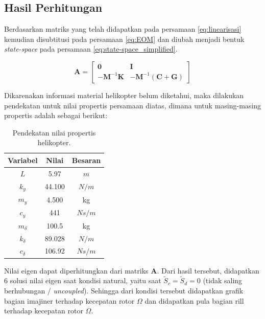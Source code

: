 \subsection{Hasil Perhitungan}

Berdasarkan matriks yang telah didapatkan pada persamaan \ref{eq:linearisasi} kemudian disubtitusi pada persamaan \ref{eq:EOM} dan diubah menjadi bentuk \textit{state-space} pada persamaan \ref{eq:state-space_simplified}.

\begin{equation}
	\mathbf{A}=\begin{bmatrix}
	\mathbf{0}& \mathbf{I}\\
	\mathbf{-M}^{-1}\mathbf{K}& \mathbf{-M}^{-1}(\mathbf{C}+\mathbf{G})
	\end{bmatrix}
\end{equation}

Dikarenakan informasi material helikopter belum diketahui, maka dilakukan pendekatan untuk nilai propertis persamaan diatas, dimana untuk masing-masing propertis adalah sebagai berikut:

\begin{table}[H]
	\centering
	\caption{Pendekatan nilai propertis helikopter.}
	\label{tb:propertis}
	\begin{tabular}{|c|c|c|}
		\hline
		Variabel     & Nilai  	& Besaran \\ \hline
		$L$          & 5.97  	& $m$     \\ \hline
		$k_y$        & 44.100  	& $N/m$   \\ \hline
		$m_y$        & 4.500   	& kg      \\ \hline
		$c_y$        & 441    	& $Ns/m$  \\ \hline
		$m_{\delta}$ & 100.5  	& kg      \\ \hline
		$k_{\delta}$ & 89.028  	& $N/m$   \\ \hline
		$c_{\delta}$ & 106.92 	& $Ns/m$  \\ \hline
	\end{tabular}
\end{table}

Nilai eigen dapat diperhitungkan dari matriks $\mathbf{A}$. Dari hasil tersebut, didapatkan 6 solusi nilai eigen saat kondisi natural, yaitu saat $\tilde{S}_c = \tilde{S}_d = 0$ (tidak saling berhubungan / \textit{uncoupled}). Sehingga dari kondisi tersebut didapatkan grafik bagian imajiner terhadap kecepatan rotor $\Omega$ dan didapatkan pula bagian rill terhadap kecepatan rotor $\Omega$.

